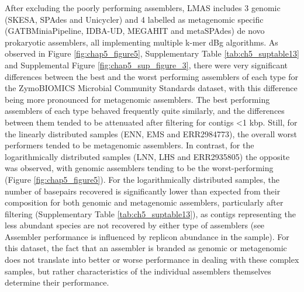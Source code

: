 After excluding the poorly performing assemblers, LMAS includes 3 genomic (SKESA, SPAdes and Unicycler) and 4 labelled as metagenomic specific (GATBMiniaPipeline, IDBA-UD, MEGAHIT and metaSPAdes) de novo prokaryotic assemblers, all implementing multiple k-mer \ac{dBg} algorithms. As observed in Figure \ref{fig:chap5_figure5}, Supplementary Table \ref{tab:ch5_suptable13} and Supplemental Figure \ref{fig:chap5_sup_figure_3},  there were very significant differences between the best and the worst performing assemblers of each type for the ZymoBIOMICS Microbial Community Standards dataset, with this difference being more pronounced for metagenomic assemblers. The best performing assemblers of each type behaved frequently quite similarly, and the differences between them tended to be attenuated after filtering for contigs <1 k\ac{bp}. Still, for the linearly distributed samples (ENN, EMS and ERR2984773), the overall worst performers tended to be metagenomic assemblers. In contrast, for the logarithmically distributed samples (LNN, LHS and ERR2935805) the opposite was observed, with genomic assemblers tending to be the worst-performing (Figure \ref{fig:chap5_figure5}). For the logarithmically distributed samples, the number of basepairs recovered is significantly lower than expected from their composition for both genomic and metagenomic assemblers, particularly after filtering (Supplementary Table \ref{tab:ch5_suptable13}), as contigs representing the less abundant species are not recovered by either type of assemblers (see Assembler performance is influenced by replicon abundance in the sample). For this dataset, the fact that an assembler is branded as genomic or metagenomic does not translate into better or worse performance in dealing with these complex samples, but rather characteristics of the individual assemblers themselves determine their performance.

